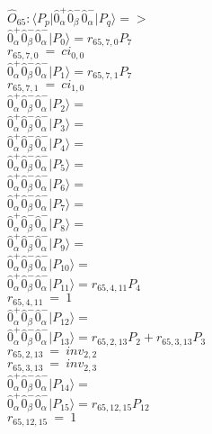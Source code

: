\documentclass[14pt]{article}
\begin{document}
    $\hat{O}_{65}:  \langle{P_p}\vert \hat{0}_{\alpha}^{+}\hat{0}_{\beta}^{-}\hat{0}_{\alpha}^{-} \vert{P_q}\rangle => $ \\ 
    $ \hat{0}_{\alpha}^{+}\hat{0}_{\beta}^{-}\hat{0}_{\alpha}^{-} \vert{P_{0}}\rangle = {r}_{65,7,0}P_{7} $ \\ 
    ${r}_{65,7,0}\ =\ {ci}_{0,0} $ \\ 
    $ \hat{0}_{\alpha}^{+}\hat{0}_{\beta}^{-}\hat{0}_{\alpha}^{-} \vert{P_{1}}\rangle = {r}_{65,7,1}P_{7} $ \\ 
    ${r}_{65,7,1}\ =\ {ci}_{1,0} $ \\ 
    $ \hat{0}_{\alpha}^{+}\hat{0}_{\beta}^{-}\hat{0}_{\alpha}^{-} \vert{P_{2}}\rangle =  $ \\ 
    $ \hat{0}_{\alpha}^{+}\hat{0}_{\beta}^{-}\hat{0}_{\alpha}^{-} \vert{P_{3}}\rangle =  $ \\ 
    $ \hat{0}_{\alpha}^{+}\hat{0}_{\beta}^{-}\hat{0}_{\alpha}^{-} \vert{P_{4}}\rangle =  $ \\ 
    $ \hat{0}_{\alpha}^{+}\hat{0}_{\beta}^{-}\hat{0}_{\alpha}^{-} \vert{P_{5}}\rangle =  $ \\ 
    $ \hat{0}_{\alpha}^{+}\hat{0}_{\beta}^{-}\hat{0}_{\alpha}^{-} \vert{P_{6}}\rangle =  $ \\ 
    $ \hat{0}_{\alpha}^{+}\hat{0}_{\beta}^{-}\hat{0}_{\alpha}^{-} \vert{P_{7}}\rangle =  $ \\ 
    $ \hat{0}_{\alpha}^{+}\hat{0}_{\beta}^{-}\hat{0}_{\alpha}^{-} \vert{P_{8}}\rangle =  $ \\ 
    $ \hat{0}_{\alpha}^{+}\hat{0}_{\beta}^{-}\hat{0}_{\alpha}^{-} \vert{P_{9}}\rangle =  $ \\ 
    $ \hat{0}_{\alpha}^{+}\hat{0}_{\beta}^{-}\hat{0}_{\alpha}^{-} \vert{P_{10}}\rangle =  $ \\ 
    $ \hat{0}_{\alpha}^{+}\hat{0}_{\beta}^{-}\hat{0}_{\alpha}^{-} \vert{P_{11}}\rangle = {r}_{65,4,11}P_{4} $ \\ 
    ${r}_{65,4,11}\ =\ 1 $ \\ 
    $ \hat{0}_{\alpha}^{+}\hat{0}_{\beta}^{-}\hat{0}_{\alpha}^{-} \vert{P_{12}}\rangle =  $ \\ 
    $ \hat{0}_{\alpha}^{+}\hat{0}_{\beta}^{-}\hat{0}_{\alpha}^{-} \vert{P_{13}}\rangle = {r}_{65,2,13}P_{2}+{r}_{65,3,13}P_{3} $ \\ 
    ${r}_{65,2,13}\ =\ {inv}_{2,2} $ \\ 
    ${r}_{65,3,13}\ =\ {inv}_{2,3} $ \\ 
    $ \hat{0}_{\alpha}^{+}\hat{0}_{\beta}^{-}\hat{0}_{\alpha}^{-} \vert{P_{14}}\rangle =  $ \\ 
    $ \hat{0}_{\alpha}^{+}\hat{0}_{\beta}^{-}\hat{0}_{\alpha}^{-} \vert{P_{15}}\rangle = {r}_{65,12,15}P_{12} $ \\ 
    ${r}_{65,12,15}\ =\ 1 $ \\ 
    
\end{document}

